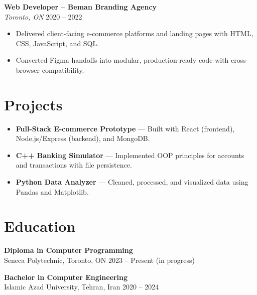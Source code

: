 \documentclass[letterpaper,10pt]{article}
\begin{document}
\textbf{Web Developer – Beman Branding Agency}\\
\textit{Toronto, ON} \hfill 2020 -- 2022
\begin{itemize}[leftmargin=*]
  \item Delivered client-facing e-commerce platforms and landing pages with HTML, CSS, JavaScript, and SQL.
  \item Converted Figma handoffs into modular, production-ready code with cross-browser compatibility.
\end{itemize}

\section*{Projects}
\begin{itemize}[leftmargin=*]
  \item \textbf{Full-Stack E-commerce Prototype} — Built with React (frontend), Node.js/Express (backend), and MongoDB.
  \item \textbf{C++ Banking Simulator} — Implemented OOP principles for accounts and transactions with file persistence.
  \item \textbf{Python Data Analyzer} — Cleaned, processed, and visualized data using Pandas and Matplotlib.
\end{itemize}

\section*{Education}
\textbf{Diploma in Computer Programming} \\ Seneca Polytechnic, Toronto, ON \hfill 2023 -- Present (in progress)

\textbf{Bachelor in Computer Engineering} \\ Islamic Azad University, Tehran, Iran \hfill 2020 -- 2024
\end{document}
